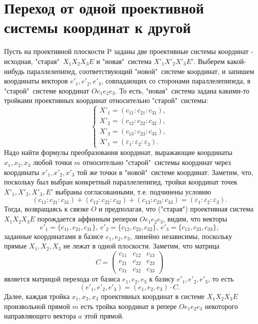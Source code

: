 \documentclass[a4paper, 12pt]{article}
\renewcommand{\epsilon}{\varepsilon}
\theoremstyle{definition}
\begin{document}
\section{Переход от одной проективной системы координат к другой}
Пусть на проективной плоскости P заданы две проективные системы координат - исходная, "старая"\ $X_1X_2X_3E$ и "новая"\ система $X'_1X'_2X'_3E'$. Выберем какой-нибудь параллелепипед, соответствующий "новой"\ системе координат, и запишем координаты векторов $e'_1, e'_2, e'_3$, совпадающих со сторонами параллелепипеда, в "старой"\ системе координат $Oe_1e_2e_3$. То есть, "новая"\ система задана какими-то тройками проективных координат относительно "старой"\ системы:
\[ \begin{cases}
    X'_1 = (c_{11} : c_{21} : c_{31}), \\
    X'_2 = (c_{12} : c_{22} : c_{32}), \\
    X'_3 = (c_{13} : c_{23} : c_{33}), \\
    X'_1 = (\epsilon_1 : \epsilon_2 : \epsilon_3).
\end{cases} \]
Надо найти формулы преобразования координат, выражающие координаты $x_1, x_2, x_3$ любой точки $m$ относительно "старой"\ системы координат через координаты $x'_1, x'_2, x'_3$ той же точки в "новой"\ системе координат. Заметим, что, поскольку был выбран конкретный параллелепипед, тройки координат точек $X'_1, X'_2, X'_3, E'$ выбраны согласованными, т.е. подчинены условию
\[ (c_{11} : c_{21} : c_{31}) + (c_{12} : c_{22} : c_{32}) + (c_{13} : c_{23} : c_{33}) = (\epsilon_1 : \epsilon_2 : \epsilon_3). \]
Тогда, возвращаясь к связке $O$ и предполагая, что ("старая") проективная система $X_1X_2X_3E$ порождается аффинным репером $Oe_1e_2e_3$, видим, что векторы
\[ e'_1 = \{c_{11}, c_{21}, c_{31}\}, \ e'_2 = \{c_{12}, c_{22}, c_{32}\}, \ e'_3 = \{c_{13}, c_{23}, c_{33}\}, \]
заданные координатами в базисе $e_1, e_2, e_3$, линейно независимы, поскольку прямые $X_1, X_2, X_3$ не лежат в одной плоскости. Заметим, что матрица
\[C = \begin{pmatrix} c_{11}&c_{12}&c_{13} \\ c_{21}&c_{22}&c_{23} \\ c_{31}&c_{32}&c_{33} \end{pmatrix}\]
является матрицой перехода от базиса $e_1, e_2, e_3$ к базису $e'_1, e'_2, e'_3$, то есть
\[ (e'_1, e'_2, e'_3) = (e_1, e_2, e_3) \cdot C. \]
Далее, каждая тройка $x_1, x_2, x_3$ проективных координат в системе $X_1X_2X_3E$ произвольной прямой $m$ есть тройка координат в репере $Oe_1e_2e_3$ некоторого направляющего вектора $a$ этой прямой.
\end{document}

